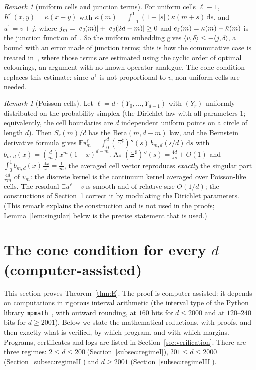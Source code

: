 \documentclass[11pt]{amsart}
\theoremstyle{definition}
\theoremstyle{remark}
\newtheorem{remark}[theorem]{Remark}
\numberwithin{equation}{section}
\newcommand{\E}{\mathbb{E}}
\newcommand{\ip}[2]{\langle #1,#2\rangle}
\newcommand{\Sh}{\Xi^{\sharp}}
\newcommand{\dd}{\,\mathrm{d}}
\begin{document}
\begin{remark}[uniform cells and junction terms]\label{rem:uniform}
For uniform cells $\ell\equiv1$, $K^1(x,y)=\bar\kappa(x-y)$ with $\bar\kappa(m)=\int_{-1}^1(1-|s|)\kappa(m+s)\dd s$, and
$u^1=v+j$, where $j_m=|e_{\rm J}(m)|+|e_{\rm J}(2d-m)|\ge0$ and $e_{\rm J}(m)=\kappa(m)-\bar\kappa(m)$ is the junction function
of~\cite[Lemma~4.9]{MS-classical}. So the uniform embedding gives $\ip v\delta\le-\ip j\delta$, a bound with an error made of
junction terms; this is how the commutative case is treated in~\cite{MS-classical}, where those terms are estimated
using the cyclic order of optimal colourings, an argument with no known operator analogue. The cone condition replaces
this estimate: since $u^1$ is not proportional to $v$, non-uniform cells are needed.
\end{remark}

\begin{remark}[Poisson cells]\label{rem:poisson}
Let $\ell=d\cdot(Y_0,\dots,Y_{d-1})$ with $(Y_r)$ uniformly distributed on the probability simplex (the Dirichlet law
with all parameters $1$; equivalently, the cell boundaries are $d$ independent uniform points on a circle of length
$d$). Then $S_r(m)/d$ has the Beta$(m,d-m)$ law, and the Bernstein derivative formula gives
$\E u^\ell_m=\int_0^d(\Sh)''(s)\,b_{m,d}(s/d)\dd s$ with $b_{m,d}(x)=\binom dmx^m(1-x)^{d-m}$. As
$(\Sh)''(s)=\frac{4d}{\pi s}+O(1)$ and $\int_0^1b_{m,d}(x)\frac{\dd x}x=\frac1m$, the averaged cell vector reproduces
\emph{exactly} the singular part $\frac{4d}{\pi m}$ of $v_m$: the discrete kernel is the continuum kernel averaged over
Poisson-like cells. The residual $\E u^\ell-v$ is smooth and of relative size $O(1/d)$; the constructions of
Section~\ref{sec:cone} correct it by modulating the Dirichlet parameters. (This remark explains the construction and
is not used in the proofs; Lemma~\ref{lem:singular} below is the precise statement that is used.)
\end{remark}

\section{The cone condition for every \texorpdfstring{$d$}{d} (computer-assisted)}\label{sec:cone}

This section proves Theorem~\ref{thm:E}. The proof is computer-assisted: it depends on computations in rigorous
interval arithmetic (the interval type of the Python library \texttt{mpmath}~\cite{mpmath}, with outward rounding, at
$160$ bits for $d\le2000$ and at $120$--$240$ bits for $d\ge2001$). Below we state the mathematical reductions, with
proofs, and then exactly what is verified, by which program, and with which margins. Programs, certificates and logs
are listed in Section~\ref{sec:verification}.
There are three regimes: $2\le d\le200$ (Section~\ref{subsec:regimeI}), $201\le d\le2000$
(Section~\ref{subsec:regimeII}) and $d\ge2001$ (Section~\ref{subsec:regimeIII}).
\end{document}
